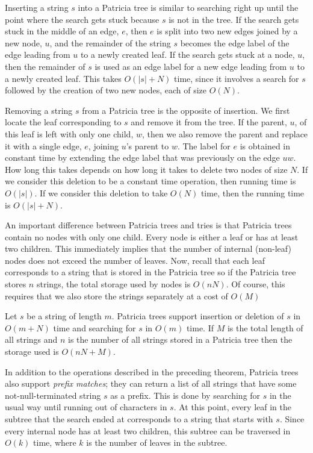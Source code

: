 Inserting a string $s$ into a Patricia tree is similar to searching
right up until the point where the search gets stuck because $s$ is not
in the tree.  If the search gets stuck in the middle of an edge, $e$,
then $e$ is split into two new edges joined by a new node, $u$, and the
remainder of the string $s$ becomes the edge label of the edge leading
from $u$ to a newly created leaf.  If the search gets stuck at a node,
$u$, then the remainder of $s$ is used as an edge label for a new edge
leading from $u$ to a newly created leaf.  This takes $O(|s|+N)$ time,
since it involves a search for $s$ followed by the creation of two new
nodes, each of size $O(N)$.

Removing a string $s$ from a Patricia tree is the opposite of insertion.
We first locate the leaf corresponding to $s$ and remove it from the
tree.  If the parent, $u$, of this leaf is left with only one child,
$w$, then we also remove the parent and replace it with a single edge,
$e$, joining $u$'s parent to $w$.  The label for $e$ is obtained in
constant time by extending the edge label that was previously on the
edge $uw$. How long this takes depends on how long it takes to delete
two nodes of size $N$.  If we consider this deletion to be a constant
time operation, then running time is $O(|s|)$.  If we consider this
deletion to take $O(N)$ time, then the running time is $O(|s|+N)$.

An important difference between Patricia trees and tries is that
Patricia trees contain no nodes with only one child.  Every node is
either a leaf or has at least two children.  This immediately implies
that the number of internal (non-leaf) nodes does not exceed the number of
leaves.  Now, recall that each leaf corresponds to a string that is
stored in the Patricia tree so if the Patricia tree stores $n$
strings, the total storage used by nodes is $O(nN)$.  Of course, this
requires that we also store the strings separately at a cost of $O(M)$

\begin{thm}
Let $s$ be a string of length $m$.  Patricia trees support insertion
or deletion of $s$ in $O(m+N)$ time and searching for $s$ in $O(m)$
time.  If $M$ is the total length of all strings and $n$ is the number
of all strings stored in a Patricia tree then the storage used is
$O(nN+M)$.
\end{thm}

In addition to the operations described in the preceding theorem, Patricia trees also support \emph{prefix matches}; they can return a list of all strings that have some not-null-terminated string $s$ as a prefix.  This is done by searching for $s$ in the usual way until running out of characters in $s$.  At this point, every leaf in the subtree that the search ended at corresponds to a string that starts with $s$.  Since every internal node has at least two children, this subtree can be traversed in $O(k)$ time, where $k$ is the number of leaves in the subtree.


